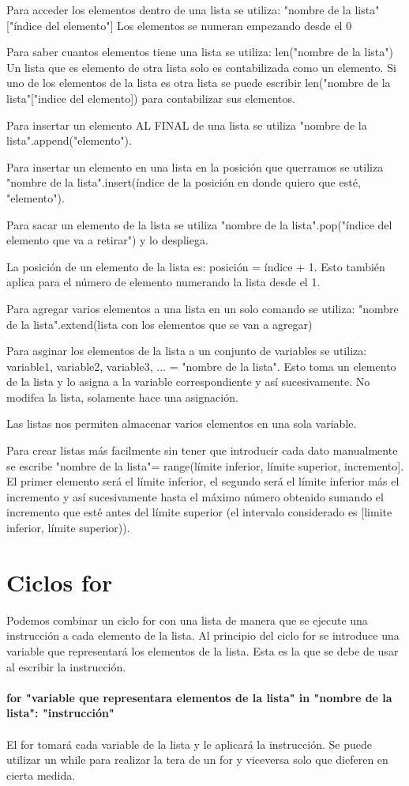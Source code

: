 \documentclass[letterpaper, 12pt, oneside]{article}%
\begin{document}
Para acceder los elementos dentro de una lista se utiliza:
"nombre de la lista"["índice del elemento"]
Los elementos se numeran empezando desde el 0

Para saber cuantos elementos tiene una lista se utiliza:
len("nombre de la lista")
Un lista que es elemento de otra lista solo es contabilizada como un elemento. 
Si uno de los elementos de la lista es otra lista se puede escribir len("nombre de la lista"["indice del elemento]) para contabilizar sus elementos.

Para insertar un elemento AL FINAL de una lista se utiliza "nombre de la lista".append("elemento").

Para insertar un elemento en una lista en la posición que querramos se utiliza "nombre de la lista".insert(índice de la posición en donde quiero que esté, "elemento").

Para sacar un elemento de la lista se utiliza "nombre de la lista".pop("índice del elemento que va a retirar") y lo despliega.

La posición de un elemento de la lista es: posición = índice + 1. Esto también aplica para el número de elemento numerando la lista desde el 1.

Para agregar varios elementos a una lista en un solo comando se utiliza: "nombre de la lista".extend(lista con los elementos que se van a agregar) 
 
Para asginar los elementos de la lista a un conjunto de variables se utiliza:
variable1, variable2, variable3, ... = "nombre de la lista". Esto toma un elemento de la lista y lo asigna a la variable correspondiente y así sucesivamente. No modifca la lista, solamente hace una asignación. 

Las listas nos permiten almacenar varios elementos en una sola variable. 

Para crear listas más facilmente sin tener que introducir cada dato manualmente se escribe
"nombre de la lista"= range(límite inferior, límite superior, incremento]. El primer elemento será el límite inferior, el segundo será el límite inferior más el incremento y así sucesivamente hasta el máximo número obtenido sumando el incremento que esté antes del límite superior (el intervalo considerado es [limite inferior, límite superior)).

\section{Ciclos for}

Podemos combinar un ciclo for con una lista de manera que se ejecute una instrucción a cada elemento de la lista. Al principio del ciclo for se introduce una variable que representará los elementos de la lista. Esta es la que se debe de usar al escribir la instrucción. 
\\\\
\textbf{for "variable que representara elementos de la lista" in "nombre de la lista":
"instrucción"}
\\\\
El for tomará cada variable de la lista y le aplicará la instrucción. 
Se puede utilizar un while para realizar la tera de un for y viceversa solo que dieferen en cierta medida. 
\end{document}
